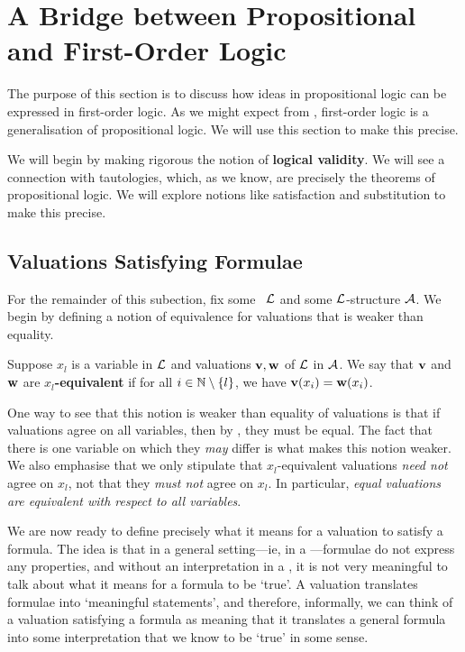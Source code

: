 \section{A Bridge between Propositional and First-Order Logic}

The purpose of this section is to discuss how ideas in propositional logic can be expressed in first-order logic. As we might expect from , first-order logic is a generalisation of propositional logic. We will use this section to make this precise.

We will begin by making rigorous the notion of \textbf{logical validity}. We will see a connection with tautologies, which, as we know, are precisely the theorems of propositional logic. We will explore notions like satisfaction and substitution to make this precise.

\subsection{Valuations Satisfying Formulae}

For the remainder of this subection, fix some \fola\ $\mathcal{L}$ and some $\mathcal{L}$-structure $\mathcal{A}$. We begin by defining a notion of equivalence for valuations that is weaker than equality.

\begin{boxdefinition}
    Suppose $x_l$ is a variable in $\mathcal{L}$ and valuations $\mathbf{v}, \mathbf{w}$ of $\mathcal{L}$ in $\mathcal{A}$. We say that $\mathbf{v}$ and $\mathbf{w}$ are \textbf{$x_l$-equivalent} if for all $i \in \mathbb{N} \setminus \left\{ l \right\}$, we have $\mathbf{v}\!\left( x_i \right) = \mathbf{w}\!\left( x_i \right)$.
\end{boxdefinition}

One way to see that this notion is weaker than equality of valuations is that if valuations agree on all variables, then by , they must be equal. The fact that there is one variable on which they \textit{may} differ is what makes this notion weaker. We also emphasise that we only stipulate that $x_l$-equivalent valuations \textit{need not} agree on $x_l$, not that they \textit{must not} agree on $x_l$. In particular, \textit{equal valuations are equivalent with respect to all variables}.

We are now ready to define precisely what it means for a valuation to satisfy a formula. The idea is that in a general setting---ie, in a \fola---formulae do not express any properties, and without an interpretation in a \fos, it is not very meaningful to talk about what it means for a formula to be `true'. A valuation translates formulae into `meaningful statements', and therefore, informally, we can think of a valuation satisfying a formula as meaning that it translates a general formula into some interpretation that we know to be `true' in some sense.

